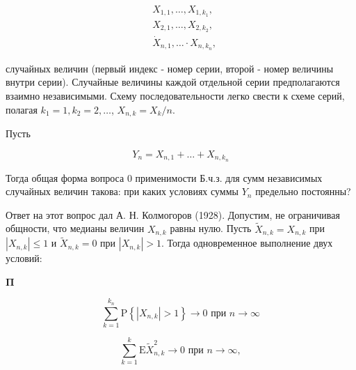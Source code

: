 \documentclass[10pt]{article}
\begin{document}
\[

\begin{aligned}

& X_{1,1}, \ldots, X_{1, k_{1}}, \\

& X_{2,1}, \ldots, X_{2, k_{2}}, \\

& \dot{X}_{n, 1}, \ldots \cdot X_{n, k_{n}},

\end{aligned}

\]



случайных величин (первый индекс - номер серии, второй - номер величины внутри серии). Случайные величины каждой отдельной серии предполагаются взаимно независимыми. Схему последовательности легко свести к схеме серий, полагая $k_{1}=1, k_{2}=2, \ldots$, $X_{n, k}=X_{k} / n$.



Пусть



\[

Y_{n}=X_{n, 1}+\ldots+X_{n, k_{n}}

\]



Тогда общая форма вопроса 0 применимости Б.ч.з. для сумм независимых случайных величин такова: при каких условиях суммы $Y_{n}$ предельно постоянны?



Ответ на этот вопрос дал А. Н. Колмогоров (1928). Допустим, не ограничивая общности, что медианы величин $X_{n, k}$ равны нулю. Пусть $\tilde{X}_{n, k}=X_{n, k}$ при $\left|X_{n, k}\right| \leqslant 1$ и $\tilde{X}_{n, k}=0$ при $\left|X_{n, k}\right|>1$. Тогда одновременное выполнение двух условий:



$\boldsymbol{\Pi}$



\[

\sum_{k=1}^{k_{n}} \mathrm{P}\left\{\left|X_{n, k}\right|>1\right\} \longrightarrow 0 \text { при } n \longrightarrow \infty

\]



\[

\sum_{k=1}^{k} \mathrm{E} \tilde{X}_{n, k}^{2} \longrightarrow 0 \text { при } n \longrightarrow \infty,

\]
\end{document}
